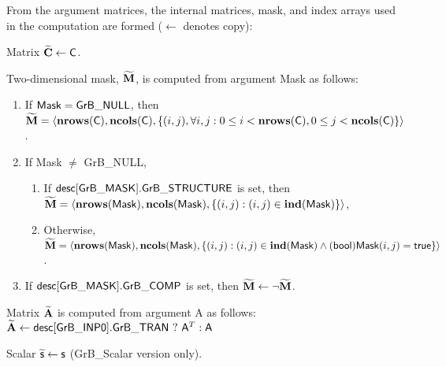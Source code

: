 From the argument matrices, the internal matrices, mask, and index arrays used in 
the computation are formed ($\leftarrow$ denotes copy):
\begin{enumerate}
    \item Matrix ${\bf \widetilde{C}} \leftarrow {\sf C}$.

    \item Two-dimensional mask, ${\bf \widetilde{M}}$, is computed from 
    argument {\sf Mask} as follows:
    \begin{enumerate}
        \item If ${\sf Mask} = {\sf GrB\_NULL}$, then ${\bf \widetilde{M}} = 
        \langle \bold{nrows}({\sf C}), \bold{ncols}({\sf C}), \{(i,j), 
        \forall i,j : 0 \leq i <  \bold{nrows}({\sf C}), 0 \leq j < 
        \bold{ncols}({\sf C}) \} \rangle$.

        \item If {\sf Mask} $\ne$ {\sf GrB\_NULL},
        \begin{enumerate}
            \item If ${\sf desc[GrB\_MASK].GrB\_STRUCTURE}$ is set, then 
            ${\bf \widetilde{M}} = \langle \bold{nrows}({\sf Mask}), 
            \bold{ncols}({\sf Mask}), \{(i,j) : (i,j) \in \bold{ind}({\sf Mask}) \} \rangle$,
            \item Otherwise, ${\bf \widetilde{M}} = \langle \bold{nrows}({\sf Mask}), 
            \bold{ncols}({\sf Mask}), \\ \{(i,j) : (i,j) \in \bold{ind}({\sf Mask}) \wedge 
            ({\sf bool}){\sf Mask}(i,j) = {\sf true}\} \rangle$.
        \end{enumerate}

        \item    If ${\sf desc[GrB\_MASK].GrB\_COMP}$ is set, then 
        ${\bf \widetilde{M}} \leftarrow \neg {\bf \widetilde{M}}$.
    \end{enumerate}

    \item Matrix ${\bf \widetilde{A}}$ is computed from argument {\sf A} as 
    follows:  ${\bf \widetilde{A}}\leftarrow {\sf desc[GrB\_INP0].GrB\_TRAN} \ ? \ {\sf A}^T : {\sf A}$

{\color{red}
    \item Scalar $\widetilde{\sf s} \leftarrow {\sf s}$ ({\sf GrB\_Scalar} version only).
}
\end{enumerate}


